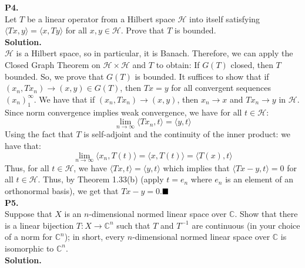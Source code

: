 \documentclass{article}
\begin{document}
    \textbf{P4.}\\
    
    Let $T$ be a linear operator from a Hilbert space $\mathscr{H}$ into itself satisfying $\langle Tx,y\rangle = \langle x,Ty\rangle$ for all $x,y\in\mathscr{H}$. Prove
    that $T$ is bounded.\\

    \textbf{Solution.}\\

    $\mathscr{H}$ is a Hilbert space, so in particular, it is Banach. Therefore, we can apply the Closed Graph Theorem on $\mathscr{H}\times\mathscr{H}$ and $T$
    to obtain: If $G(T)$ closed, then $T$ bounded. So, we prove that $G(T)$ is bounded. It suffices to show that if $(x_n,Tx_n)\to (x,y)\in G(T)$, then $Tx = y$
    for all convergent sequences $(x_n)_1^{\infty}$. We have that if $(x_n,Tx_n)\to (x,y)$, then $x_n\to x$ and $Tx_n \to y$ in $\mathscr{H}$. Since norm convergence
    implies weak convergence, we have for all $t\in\mathscr{H}$:
    \[ \lim_{n\to\infty} \langle Tx_n,t\rangle = \langle y,t\rangle \]
    Using the fact that $T$ is self-adjoint and the continuity of the inner product: we have that:
    \[ \lim_{n\to\infty} \langle x_n,T(t)\rangle = \langle x,T(t)\rangle = \langle T(x),t\rangle \]
    Thus, for all $t\in\mathscr{H}$, we have $\langle Tx,t\rangle = \langle y,t\rangle$ which implies that $\langle Tx-y,t\rangle=0$ for all $t\in\mathscr{H}$. Thus,
    by Theorem 1.33(b) (apply $t=e_n$ where $e_n$ is an element of an orthonormal basis), we get that $Tx-y=0$.$\hfill\blacksquare$\\

    \newpage
    \textbf{P5.}\\

    Suppose that $X$ is an $n$-dimensional normed linear space over $\mathbb{C}$. Show that there is a linear bijection $T:X\to\mathbb{C}^n$ such that $T$ and $T^{-1}$
    are continuous (in your choice of a norm for $\mathbb{C}^n$); in short, every $n$-dimensional normed linear space over $\mathbb{C}$ is isomorphic to $\mathbb{C}^n$.\\

    \textbf{Solution.}\\
\end{document}
